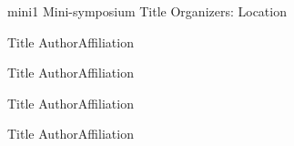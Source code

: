 \mini
{mini1}
{Mini-symposium Title}{}
{Organizers: }
{Location}

\begin{talks}
\item\talk
{Title}
{Author}{Affiliation}

\item\talk
{Title}
{Author}{Affiliation}

\item\talk
{Title}
{Author}{Affiliation}

\item\talk
{Title}
{Author}{Affiliation}
\end{talks}
\room
